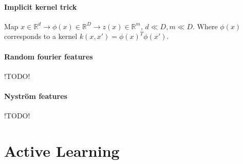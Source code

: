 \documentclass[a4paper, 9pt, DIV=24]{scrartcl}
\newcommand{\R}{\mathbb{R}}
\begin{document}
\begin{twocolumn}
\paragraph{Implicit kernel trick}
Map $x \in \R^d \rightarrow \phi(x) \in \R^D \rightarrow z(x) \in \R^m$, $d \ll D, m \ll D$.
Where $\phi(x)$ corresponds to a kernel $k(x,x') = \phi(x)^T\phi(x')$.

\paragraph{Random fourier features}
!TODO!
\paragraph{Nyström features}
!TODO!

\section{Active Learning}

\end{twocolumn}

\appendix
\end{document}
